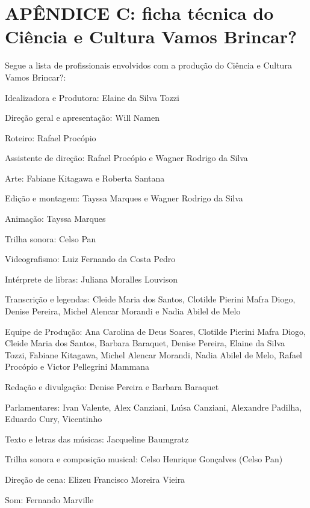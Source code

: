 \documentclass[
12pt,		%
openright,	%
twoside,  %
a4paper,			%
chapter=TITLE,		%
english,			%
french,				%
spanish,			%
brazil				%
]{USPSC-classe/USPSC}
\begin{document}
\chapter[AP\^ENDICE C: ficha t\'ecnica do \textquotedbl Ci\^encia e Cultura Vamos Brincar?\textquotedbl ]{AP\^ENDICE C: ficha t\'ecnica do \textquotedbl Ci\^encia e Cultura Vamos Brincar?\textquotedbl }\label{AP\^ENDICE C: ficha t\'ecnica do \textquotedbl Ci\^encia e Cultura Vamos Brincar?\textquotedbl }
Segue a lista de profissionais envolvidos com a produ\c{c}\~ao do \textquotedbl Ci\^encia e Cultura Vamos Brincar?\textquotedbl :


















\begin{alineas}
\item Idealizadora e Produtora: Elaine da Silva Tozzi
\item Dire\c{c}\~ao geral e apresenta\c{c}\~ao: Will Namen
\item Roteiro: Rafael Proc\'opio
\item Assistente de dire\c{c}\~ao: Rafael Proc\'opio e Wagner Rodrigo da Silva
\item Arte: Fabiane Kitagawa e Roberta Santana
\item Edi\c{c}\~ao e montagem: Tayssa Marques e Wagner Rodrigo da Silva
\item Anima\c{c}\~ao: Tayssa Marques
\item Trilha sonora: Celso Pan
\item Videografismo: Luiz Fernando da Costa Pedro
\item Int\'erprete de libras: Juliana Moralles Louvison
\item Transcri\c{c}\~ao e legendas: Cleide Maria dos Santos, Clotilde Pierini Mafra Diogo, Denise Pereira, Michel Alencar Morandi e Nadia Abilel de Melo
\item Equipe de Produ\c{c}\~ao: Ana Carolina de Deus Soares, Clotilde Pierini Mafra Diogo, Cleide Maria dos Santos, Barbara Baraquet, Denise Pereira, Elaine da Silva Tozzi, Fabiane Kitagawa, Michel Alencar Morandi, Nadia Abilel de Melo, Rafael Proc\'opio e Victor Pellegrini Mammana
\item Reda\c{c}\~ao e divulga\c{c}\~ao: Denise Pereira e Barbara Baraquet
\item Parlamentares: Ivan Valente, Alex Canziani, Lu\'{\i}sa Canziani, Alexandre Padilha, Eduardo Cury, Vicentinho
\item Texto e letras das m\'usicas: Jacqueline Baumgratz
\item Trilha sonora e composi\c{c}\~ao musical: Celso Henrique Gon\c{c}alves (Celso Pan)
\item Dire\c{c}\~ao de cena: Elizeu Francisco Moreira Vieira
\item Som: Fernando Marville
\end{alineas}
\end{document}
